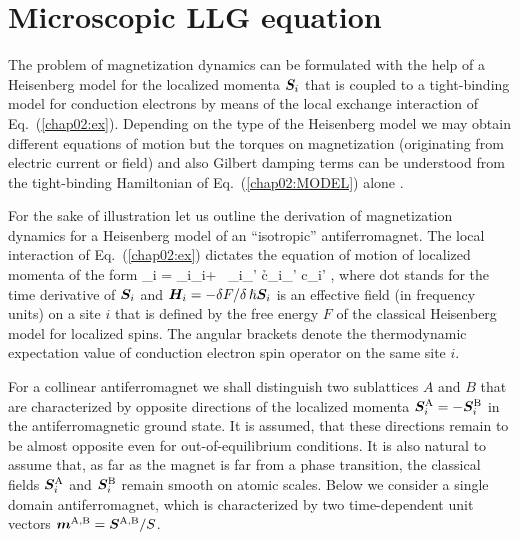 \section{Microscopic LLG equation} 

The problem of magnetization dynamics can be formulated with the help of a Heisenberg model for the localized momenta $\boldsymbol{S}_i$ that is coupled to a tight-binding model for conduction electrons by means of the local exchange interaction of Eq.~(\ref{chap02:ex}). Depending on the type of the Heisenberg model we may obtain different equations of motion but the torques on magnetization (originating from electric current or field) and also Gilbert damping terms can be understood from the tight-binding Hamiltonian of Eq.~(\ref{chap02:MODEL}) alone \cite{ado_anisotropy_2019}. 

For the sake of illustration let us outline the derivation of magnetization dynamics for a Heisenberg model of an ``isotropic'' antiferromagnet. The local interaction of Eq.~(\ref{chap02:ex}) dictates the equation of motion of localized momenta of the form
\be
\label{chap02:EOM}
_i = _i\times {}_i+ \, _i\times \s_{\sigma\sigma'} \lt\la c\h_{i\sigma}\bb{\sigma}_{\sigma\sigma'} c\0_{i\sigma'} \rt\ra,
\e
where dot stands for the time derivative of $\boldsymbol{S}_i$ and $\boldsymbol{H}_i=-\delta F/ \delta\, \hslash\boldsymbol{S}_i$ is an effective field (in frequency units) on a site $i$  that is defined by the free energy $F$ of the classical Heisenberg model for localized spins. The angular brackets denote the thermodynamic expectation value of conduction electron spin operator on the same site $i$. 

For a collinear antiferromagnet we shall distinguish two sublattices $A$ and $B$ that are characterized by opposite directions of the localized momenta $\boldsymbol{S}_i^\textrm{A}=-\boldsymbol{S}_i^\textrm{B}$ in the antiferromagnetic ground state. It is assumed, that these directions remain to be almost opposite even for out-of-equilibrium conditions. It is also natural to assume that, as far as the magnet is far from a phase transition, the classical fields $\boldsymbol{S}_i^\textrm{A}$ and $\boldsymbol{S}_i^\textrm{B}$ remain smooth on atomic scales. Below we consider a single domain antiferromagnet, which is characterized by two time-dependent unit vectors $\boldsymbol{m}^\textrm{A,B}=\boldsymbol{S}^\textrm{A,B}/S$. 

